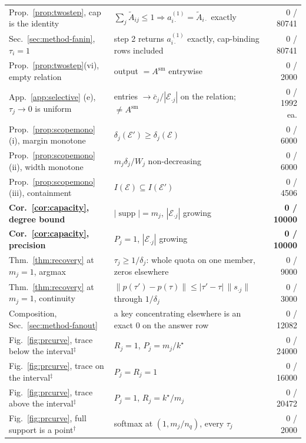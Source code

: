 \documentclass{article}
\newcommand{\supp}{\operatorname{supp}}
\begin{document}
\begin{table}[h]
\begin{tabular}{@{}llr@{}}
Prop.~\ref{prop:twostep}, cap is the identity & $\sum_j\tilde A_{ij}\le1\Rightarrow a^{(1)}_{i\cdot}=\tilde A_{i\cdot}$ exactly & 0 / 80741 \\
Sec.~\ref{sec:method-fanin}, $\tau_i=1$ & step 2 returns $a^{(1)}_{i\cdot}$ exactly, cap-binding rows included & 0 / 80741 \\
Prop.~\ref{prop:twostep}(vi), empty relation & output $=A^{\mathrm{sm}}$ entrywise & 0 / 2000 \\
App.~\ref{app:selective} (e), $\tau_j\to0$ is uniform & entries $\to\bar c_j/|\mathcal{E}_{\cdot j}|$ on the relation; $\ne A^{\mathrm{sm}}$ & 0 / 1992 ea. \\
Prop.~\ref{prop:scopemono}(i), margin monotone & $\delta_j(\mathcal{E}')\ge\delta_j(\mathcal{E})$ & 0 / 6000 \\
Prop.~\ref{prop:scopemono}(ii), width monotone & $m_j\delta_j/W_j$ non-decreasing & 0 / 6000 \\
Prop.~\ref{prop:scopemono}(iii), containment & $I(\mathcal{E})\subseteq I(\mathcal{E}')$ & 0 / 4506 \\
\textbf{Cor.~\ref{cor:capacity}, degree bound} & $|\supp| = m_j$, $|\mathcal{E}_{\cdot j}|$ growing & \textbf{0 / 10000} \\
\textbf{Cor.~\ref{cor:capacity}, precision} & $P_j=1$, $|\mathcal{E}_{\cdot j}|$ growing & \textbf{0 / 10000} \\
Thm.~\ref{thm:recovery} at $m_j=1$, argmax & $\tau_j\ge1/\delta_j$: whole quota on one member, zeros elsewhere & 0 / 9000 \\
Thm.~\ref{thm:recovery} at $m_j=1$, continuity & $\|p(\tau')-p(\tau)\|\le|\tau'-\tau|\,\|s_{\cdot j}\|$ through $1/\delta_j$ & 0 / 3000 \\
Composition, Sec.~\ref{sec:method-fanout} & a key concentrating elsewhere is an exact $0$ on the answer row & 0 / 12082 \\
\addlinespace
Fig.~\ref{fig:prcurve}, trace below the interval$^{\ddagger}$ & $R_j=1$, $P_j=m_j/k^\star$ & 0 / 24000 \\
Fig.~\ref{fig:prcurve}, trace on the interval$^{\ddagger}$ & $P_j=R_j=1$ & 0 / 16000 \\
Fig.~\ref{fig:prcurve}, trace above the interval$^{\ddagger}$ & $P_j=1$, $R_j=k^\star/m_j$ & 0 / 20472 \\
Fig.~\ref{fig:prcurve}, full support is a point$^{\dagger}$ & softmax at $(1,m_j/n_q)$, every $\tau_j$ & 0 / 2000 \\
\bottomrule
\end{tabular}
\end{table}
\end{document}
